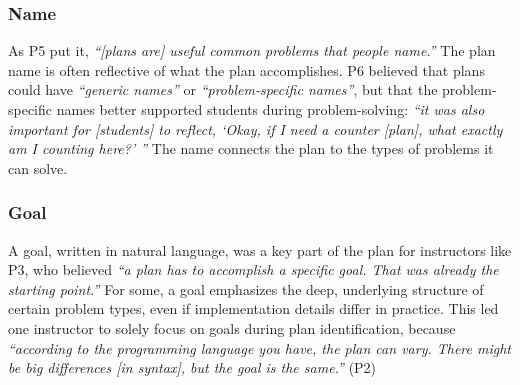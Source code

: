\subsubsection{Name}
\label{sec:name}
As P5 put it, \textit{``[plans are] useful common problems that people name.''} The plan name is often reflective of what the plan accomplishes. P6 believed that plans could have \textit{``generic names''} or \textit{``problem-specific names''}, but that the problem-specific names better supported students during problem-solving: \textit{``it was also important for [students] to reflect, `Okay, if I need a counter [plan], what exactly am I counting here?' ''}
The name connects the plan to the types of problems it can solve.

\subsubsection{Goal} 
\label{sec:goal}
A goal, written in natural language, was
a key part of the plan for instructors like P3, who believed \textit{``a plan has to accomplish a specific goal. That was already the starting point.''} 
For some, a goal emphasizes the deep, underlying structure of certain problem types, even if implementation details differ in practice. This led one instructor to solely focus on goals during plan identification, because
\textit{``according to the programming language you have, the plan can vary. There might be big differences [in syntax], but the goal is the same.''} (P2)


